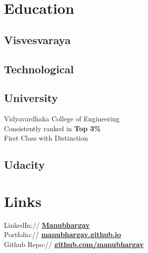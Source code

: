 \documentclass[]{deedy-resume-openfont}
\begin{document}
%
%
\lastupdated

%
%

%
%

\begin{minipage}[t]{0.33\textwidth} 


\section{Education} 
\sectionsep
\subsection{Visvesvaraya} 
\subsection{Technological} 
\subsection{University }
Vidyavardhaka College of Engineering \\ 
Consistently ranked in \textbf{Top 3\%} \\
First Class with Distinction\\
\sectionsep

\sectionsep
\subsection{Udacity}
\sectionsep


\section{Links} 
LinkedIn://  \href{https://www.linkedin.com/in/manubhargav}{\bf Manubhargav} \\
Portfolio:// \href{https://manubhargav.github.io}{\bf manubhargav.github.io} \\
Github Repo:// \href{https://github.com/manubhargav}{\bf github.com/manubhargav} \\
\sectionsep


\end{minipage}
\end{document}
